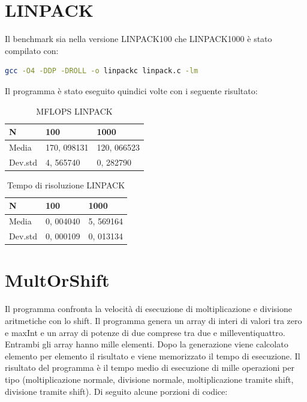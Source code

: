 \documentclass[12pt, a4paper]{report}
\begin{document}
\section{LINPACK}
Il benchmark sia nella versione LINPACK100 che LINPACK1000 è stato compilato con:

\begin{lstlisting}[language=sh, caption = {compilazione LINPACK}, captionpos = b]
gcc -O4 -DDP -DROLL -o linpackc linpack.c -lm
\end{lstlisting}


Il programma è stato eseguito quindici volte con i seguente risultato:

\begin{table}[ht]
\centering
\begin{tabular}{|l|l|l|}
\hline
N & 100 & 1000 \\ \hline
Media & 170, 098131 & 120, 066523 \\ \hline
Dev.std & 4, 565740 & 0, 282790 \\ \hline
\end{tabular}
\caption{MFLOPS LINPACK}
\end{table}

\begin{table}[ht]
\centering
\begin{tabular}{|l|l|l|}
\hline
N & 100 & 1000 \\ \hline
Media & 0, 004040 & 5, 569164 \\ \hline
Dev.std & 0, 000109 & 0, 013134 \\ \hline
\end{tabular}
\caption{Tempo di risoluzione LINPACK}
\end{table}

\section{MultOrShift}
Il programma confronta la velocità di esecuzione di moltiplicazione e divisione aritmetiche con lo shift. Il programma genera un array di interi di valori tra zero e maxInt e un array di potenze di due comprese tra due e milleventiquattro. Entrambi gli array hanno mille elementi. Dopo la generazione viene calcolato elemento per elemento il risultato e viene memorizzato il tempo di esecuzione. Il risultato del programma è il tempo medio di esecuzione di mille operazioni per tipo (moltiplicazione normale, divisione normale, moltiplicazione tramite shift, divisione tramite shift). Di seguito alcune porzioni di codice:
\end{document}
